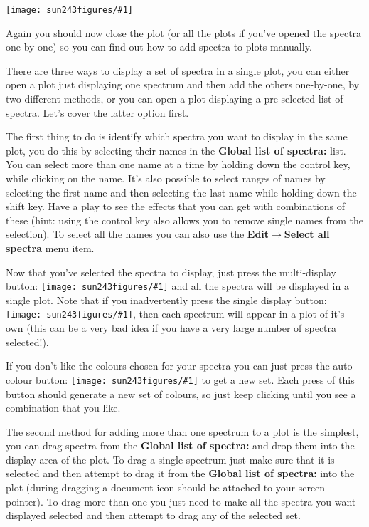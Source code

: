 \documentclass[twoside,11pt]{article}
\newcommand{\htmladdimg}[1]{}
\newcommand{\latexhtml}[2]{#1}
\renewcommand{\_}{\texttt{\symbol{95}}}
\newcommand{\mainfigure}[1]
{\begin{center}
 \latexhtml{\texttt{[image: sun243\_figures/\#1]}}{\htmladdimg{#1.gif}}
 \end{center}
}
\newcommand{\inline}[1]
        {\latexhtml{\texttt{[image: sun243\_figures/\#1]}}
        {\htmladdimg[align=center]{#1.gif}}}
\newcommand{\submenuitem}[2]{\latexhtml{\textbf{#1$\rightarrow$#2}}{\textbf{#1->#2}}}
\newcommand{\labelitem}[1]{\textbf{#1}}
\begin{document}
\mainfigure{plot2}

Again you should now close the plot (or all the plots if you've opened
the spectra one-by-one) so you can find out how to add spectra to
plots manually.

There are three ways to display a set of spectra in a single plot, you
can either open a plot just displaying one spectrum and then add the
others one-by-one, by two different methods, or you can open a plot
displaying a pre-selected list of spectra. Let's cover the latter
option first.

\label{selecting_spectra}
The first thing to do is identify which spectra you want to display in
the same plot, you do this by selecting their names in the
\labelitem{Global list of spectra:} list. You can select more than one
name at a time by holding down the control key, while clicking on the
name. It's also possible to select ranges of names by selecting the
first name and then selecting the last name while holding down the
shift key. Have a play to see the effects that you can get with
combinations of these (hint: using the control key also allows you to
remove single names from the selection). To select all the names you
can also use the \submenuitem{Edit}{Select all spectra} menu item.

Now that you've selected the spectra to display, just press the
multi-display button: \inline{multidisplay} and all the spectra
will be displayed in a single plot. Note that if you inadvertently
press the single display button: \inline{display}, then each
spectrum will appear in a plot of it's own (this can be a very bad
idea if you have a very large number of spectra selected!).

If you don't like the colours chosen for your spectra you can just press the
auto-colour button: \inline{rainbow} to get a new set. Each press of this
button should generate a new set of colours, so just keep clicking until you
see a combination that you like.

The second method for adding more than one spectrum to a plot is the
simplest, you can drag spectra from the \labelitem{Global list of
spectra:} and drop them into the display area of the plot. To drag a
single spectrum just make sure that it is selected and then attempt to
drag it from the \labelitem{Global list of spectra:} into the plot
(during dragging a document icon should be attached to your screen
pointer). To drag more than one you just need to make all the spectra
you want displayed selected and then attempt to drag any of the
selected set.
\end{document}
